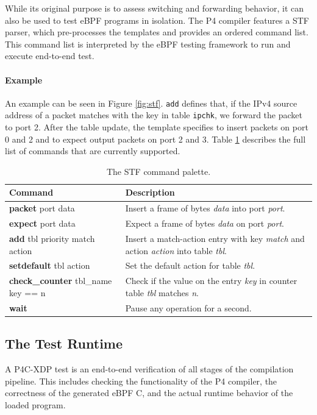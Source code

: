 While its original purpose is to assess switching and forwarding behavior, it 
can also be used to test eBPF programs in isolation. The P4 compiler features a 
STF parser, which pre-processes the templates and provides an ordered command 
list. This command list is interpreted by the eBPF testing framework to run and 
execute end-to-end test.

\paragraph{Example}
An example can be seen in Figure \ref{fig:stf}. \texttt{add} defines that, if 
the IPv4 source address of a 
packet matches with the key in table \texttt{ipchk}, we forward the packet to 
port 2. After the table update, the template specifies to insert packets on 
port 0 and 2 and to expect output packets on port 2 and 3.
Table \ref{table:stf} describes the full list of commands that are currently 
supported.


\begin{table}[h]
	\begin{center}
		\begin{tabular}{|l|p{9cm}|} \hline
			\textbf{Command} & \textbf{Description} \\ \hline \hline
			\textbf{packet} port data & Insert a frame of bytes
			\textit{data} into port \textit{port}.    \\ \hline
			\textbf{expect} port data & Expect a frame of bytes
			\textit{data} on port \textit{port}.  \\ \hline
			\textbf{add} tbl priority match action & Insert a
			match-action entry with key \textit{match} and action
			\textit{action} into table \textit{tbl}. \\ \hline
			\textbf{setdefault} tbl action & Set the default action for table
			\textit{tbl}. \\
			\hline
			\textbf{check\_counter} tbl\_name key == n & Check if the value on
			the entry \textit{key} in counter table \textit{tbl} matches
			\textit{n}.  \\
			\hline
			\textbf{wait} & Pause any operation for a second. \\ \hline
		\end{tabular}
		\caption{The STF command palette.}\label{table:stf}
	\end{center}
\end{table}

\subsection{The Test Runtime}
A P4C-XDP test is an end-to-end verification of all stages of 
the compilation pipeline. This includes checking the functionality of the P4 
compiler, the correctness of the generated eBPF C, and the actual runtime 
behavior of the loaded program.

